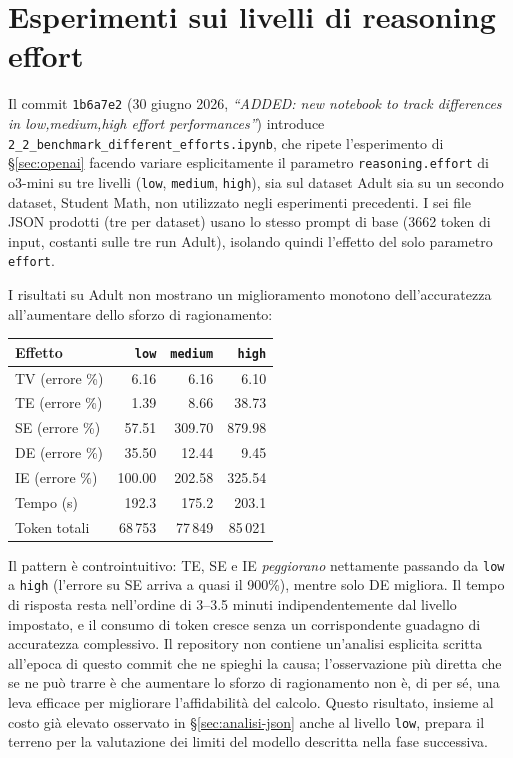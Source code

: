 \section{Esperimenti sui livelli di reasoning effort}
\label{sec:effort}

Il commit \texttt{1b6a7e2} (30 giugno 2026, \emph{``ADDED: new notebook to track differences in low,medium,high effort performances''}) introduce \texttt{2\_2\_benchmark\_different\_efforts.ipynb}, che ripete l'esperimento di \S\ref{sec:openai} facendo variare esplicitamente il parametro \texttt{reasoning.effort} di o3-mini su tre livelli (\texttt{low}, \texttt{medium}, \texttt{high}), sia sul dataset Adult sia su un secondo dataset, Student Math, non utilizzato negli esperimenti precedenti. I sei file JSON prodotti (tre per dataset) usano lo stesso prompt di base (3662 token di input, costanti sulle tre run Adult), isolando quindi l'effetto del solo parametro \texttt{effort}.

I risultati su Adult non mostrano un miglioramento monotono dell'accuratezza all'aumentare dello sforzo di ragionamento:

\begin{center}
\begin{tabular}{lrrr}
\toprule
Effetto & \texttt{low} & \texttt{medium} & \texttt{high} \\
\midrule
TV (errore \%) & 6.16 & 6.16 & 6.10 \\
TE (errore \%) & 1.39 & 8.66 & 38.73 \\
SE (errore \%) & 57.51 & 309.70 & 879.98 \\
DE (errore \%) & 35.50 & 12.44 & 9.45 \\
IE (errore \%) & 100.00 & 202.58 & 325.54 \\
\midrule
Tempo (s) & 192.3 & 175.2 & 203.1 \\
Token totali & 68\,753 & 77\,849 & 85\,021 \\
\bottomrule
\end{tabular}
\end{center}

Il pattern è controintuitivo: TE, SE e IE \emph{peggiorano} nettamente passando da \texttt{low} a \texttt{high} (l'errore su SE arriva a quasi il 900\%), mentre solo DE migliora. Il tempo di risposta resta nell'ordine di 3--3.5 minuti indipendentemente dal livello impostato, e il consumo di token cresce senza un corrispondente guadagno di accuratezza complessivo. Il repository non contiene un'analisi esplicita scritta all'epoca di questo commit che ne spieghi la causa; l'osservazione più diretta che se ne può trarre è che aumentare lo sforzo di ragionamento non è, di per sé, una leva efficace per migliorare l'affidabilità del calcolo. Questo risultato, insieme al costo già elevato osservato in \S\ref{sec:analisi-json} anche al livello \texttt{low}, prepara il terreno per la valutazione dei limiti del modello descritta nella fase successiva.
